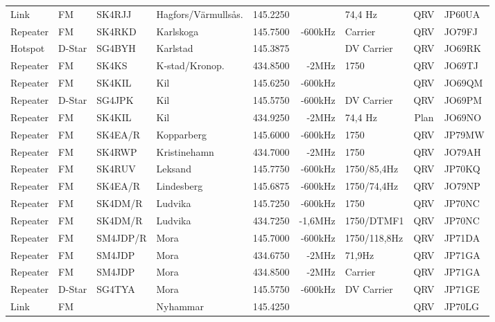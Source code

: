\begin{longtable}{llllrrlcl}
Link     & FM     & SK4RJJ   & Hagfors/Värmullsås. & 145.2250 &            & 74,4 Hz         & QRV  & JP60UA \\
Repeater & FM     & SK4RKD   & Karlskoga           & 145.7500 & -600kHz    & Carrier         & QRV  & JO79FJ \\
Hotspot  & D-Star & SG4BYH   & Karlstad            & 145.3875 &            & DV Carrier      & QRV  & JO69RK \\
Repeater & FM     & SK4KS    & K-stad/Kronop.      & 434.8500 & -2MHz      & 1750            & QRV  & JO69TJ \\
Repeater & FM     & SK4KIL   & Kil                 & 145.6250 & -600kHz    &                 & QRV  & JO69QM \\
Repeater & D-Star & SG4JPK   & Kil                 & 145.5750 & -600kHz    & DV Carrier      & QRV  & JO69PM \\
Repeater & FM     & SK4KIL   & Kil                 & 434.9250 & -2MHz      & 74,4 Hz         & Plan & JO69NO \\
Repeater & FM     & SK4EA/R  & Kopparberg          & 145.6000 & -600kHz    & 1750            & QRV  & JP79MW \\
Repeater & FM     & SK4RWP   & Kristinehamn        & 434.7000 & -2MHz      & 1750            & QRV  & JO79AH \\
Repeater & FM     & SK4RUV   & Leksand             & 145.7750 & -600kHz    & 1750/85,4Hz     & QRV  & JP70KQ \\
Repeater & FM     & SK4EA/R  & Lindesberg          & 145.6875 & -600kHz    & 1750/74,4Hz     & QRV  & JO79NP \\
Repeater & FM     & SK4DM/R  & Ludvika             & 145.7250 & -600kHz    & 1750            & QRV  & JP70NC \\
Repeater & FM     & SK4DM/R  & Ludvika             & 434.7250 & -1,6MHz    & 1750/DTMF1      & QRV  & JP70NC \\
Repeater & FM     & SM4JDP/R & Mora                & 145.7000 & -600kHz    & 1750/118,8Hz    & QRV  & JP71DA \\
Repeater & FM     & SM4JDP   & Mora                & 434.6750 & -2MHz      & 71,9Hz          & QRV  & JP71GA \\
Repeater & FM     & SM4JDP   & Mora                & 434.8500 & -2MHz      & Carrier         & QRV  & JP71GA \\
Repeater & D-Star & SG4TYA   & Mora                & 145.5750 & -600kHz    & DV Carrier      & QRV  & JP71GE \\
Link     & FM     &          & Nyhammar            & 145.4250 &            &                 & QRV  & JP70LG \\

\end{longtable}
